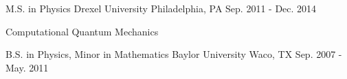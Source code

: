

\begin{cventries}

  \cventry
    {M.S. in Physics} %
    {Drexel University} %
    {Philadelphia, PA} %
    {Sep. 2011 - Dec. 2014} %
    {
      \begin{cvitems} %
        \item {Computational Quantum Mechanics}
      \end{cvitems}
    }

  \cventry
    {B.S. in Physics, Minor in Mathematics} %
    {Baylor University} %
    {Waco, TX} %
    {Sep. 2007 - May. 2011} %
    {
      \begin{cvitems} %
      \end{cvitems}
    }
\end{cventries}

